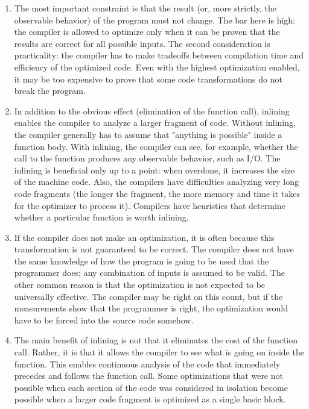 \begin{enumerate}
\item 
The most important constraint is that the result (or, more strictly, the observable behavior) of the program must not change. The bar here is high: the compiler is allowed to optimize only when it can be proven that the results are correct for all possible inputs. The second consideration is practicality: the compiler has to make tradeoffs between compilation time and efficiency of the optimized code. Even with the highest optimization enabled, it may be too expensive to prove that some code transformations do not break the program. 

\item 
In addition to the obvious effect (elimination of the function call), inlining enables the compiler to analyze a larger fragment of code. Without inlining, the compiler generally has to assume that "anything is possible" inside a function body. With inlining, the compiler can see, for example, whether the call to the function produces any observable behavior, such as I/O. The inlining is beneficial only up to a point: when overdone, it increases the size of the machine code. Also, the compilers have difficulties analyzing very long code fragments (the longer the fragment, the more memory and time it takes for the optimizer to process it). Compilers have heuristics that determine whether a particular function is worth inlining.

\item 
If the compiler does not make an optimization, it is often because this transformation is not guaranteed to be correct. The compiler does not have the same knowledge of how the program is going to be used that the programmer does; any combination of inputs is assumed to be valid. The other common reason is that the optimization is not expected to be universally effective. The compiler may be right on this count, but if the measurements show that the programmer is right, the optimization would have to be forced into the source code somehow.

\item
The main benefit of inlining is not that it eliminates the cost of the function call. Rather, it is that it allows the compiler to see what is going on inside the function. This enables continuous analysis of the code that immediately precedes and follows the function call. Some optimizations that were not possible when each section of the code was considered in isolation become possible when a larger code fragment is optimized as a single basic block.

\end{enumerate}